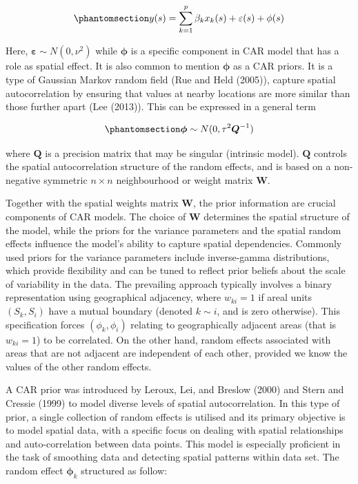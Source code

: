 \documentclass[
  default,
]{sn-jnl}
\begin{document}
\begin{equation}\phantomsection\label{eq-car}{
y(s) = \sum_{k=1}^p \beta_k x_k(s) + \varepsilon(s) + \phi(s) 
}\end{equation}

Here, \(\boldsymbol{\varepsilon} \sim N(0, \nu^2)\) while
\(\boldsymbol{\phi}\) is a specific component in CAR model that has a
role as spatial effect. It is also common to mention
\(\boldsymbol{\phi}\) as a CAR priors. It is a type of Gaussian Markov
random field (Rue and Held (2005)), capture spatial autocorrelation by
ensuring that values at nearby locations are more similar than those
further apart (Lee (2013)). This can be expressed in a general term

\begin{equation}\phantomsection\label{eq-phidist}{
\boldsymbol{\phi}\sim N(0,\tau^2\boldsymbol{Q}^{-1}) 
}\end{equation}

where \(\boldsymbol{Q}\) is a precision matrix that may be singular
(intrinsic model). \(\boldsymbol{Q}\) controls the spatial
autocorrelation structure of the random effects, and is based on a
non-negative symmetric \(n \times n\) neighbourhood or weight matrix
\(\boldsymbol{W}\).

Together with the spatial weights matrix \(\boldsymbol{W}\), the prior
information are crucial components of CAR models. The choice of
\(\boldsymbol{W}\) determines the spatial structure of the model, while
the priors for the variance parameters and the spatial random effects
influence the model's ability to capture spatial dependencies. Commonly
used priors for the variance parameters include inverse-gamma
distributions, which provide flexibility and can be tuned to reflect
prior beliefs about the scale of variability in the data. The prevailing
approach typically involves a binary representation using geographical
adjacency, where \(w_{ki} = 1\) if areal units \((S_k,S_i)\) have a
mutual boundary (denoted \(k\sim i\), and is zero otherwise). This
specification forces \((\phi_k,\phi_i)\) relating to geographically
adjacent areas (that is \(w_{ki} = 1\)) to be correlated. On the other
hand, random effects associated with areas that are not adjacent are
independent of each other, provided we know the values of the other
random effects.

A CAR prior was introduced by Leroux, Lei, and Breslow (2000) and Stern
and Cressie (1999) to model diverse levels of spatial autocorrelation.
In this type of prior, a single collection of random effects is utilised
and its primary objective is to model spatial data, with a specific
focus on dealing with spatial relationships and auto-correlation between
data points. This model is especially proficient in the task of
smoothing data and detecting spatial patterns within data set. The
random effect \(\boldsymbol\phi_k\) structured as follow:
\end{document}
